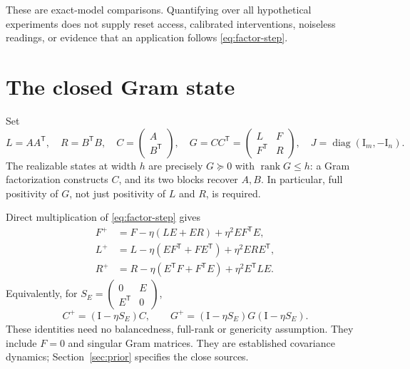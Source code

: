 \documentclass[11pt]{article}
\theoremstyle{remark}\newtheorem{remark}[theorem]{Remark}
\newcommand{\Id}{\mathrm I}
\newcommand{\rank}{\operatorname{rank}}
\newcommand{\diag}{\operatorname{diag}}
\begin{document}
These are exact-model comparisons. Quantifying over all hypothetical
experiments does not supply reset access, calibrated interventions,
noiseless readings, or evidence that an application follows
\eqref{eq:factor-step}.

\section{The closed Gram state}
Set
\begin{equation}\label{eq:gram}
 L=AA^{\mathsf T},\quad R=B^{\mathsf T}B,\quad
 C=\begin{pmatrix}A\\B^{\mathsf T}\end{pmatrix},\quad
 G=CC^{\mathsf T}=\begin{pmatrix}L&F\\F^{\mathsf T}&R\end{pmatrix},
 \quad J=\diag(\Id_m,-\Id_n).
\end{equation}
The realizable states at width $h$ are precisely $G\succeq0$ with
$\rank G\leq h$: a Gram factorization constructs $C$, and its two blocks
recover $A,B$. In particular, full positivity of $G$, not just positivity
of $L$ and $R$, is required.

Direct multiplication of \eqref{eq:factor-step} gives
\begin{align}
 F^+&=F-\eta(LE+ER)+\eta^2EF^{\mathsf T}E,\label{eq:Fstep}\\
 L^+&=L-\eta(EF^{\mathsf T}+FE^{\mathsf T})+\eta^2ERE^{\mathsf T},
 \label{eq:Lstep}\\
 R^+&=R-\eta(E^{\mathsf T}F+F^{\mathsf T}E)+\eta^2E^{\mathsf T}LE.
 \label{eq:Rstep}
\end{align}
Equivalently, for
$S_E=\left(\begin{smallmatrix}0&E\\E^{\mathsf T}&0\end{smallmatrix}\right)$,
\begin{equation}\label{eq:congruence}
 C^+=(\Id-\eta S_E)C,\qquad
 G^+=(\Id-\eta S_E)G(\Id-\eta S_E).
\end{equation}
These identities need no balancedness, full-rank or genericity assumption.
They include $F=0$ and singular Gram matrices. They are established
covariance dynamics; Section~\ref{sec:prior} specifies the close sources.
\end{document}
